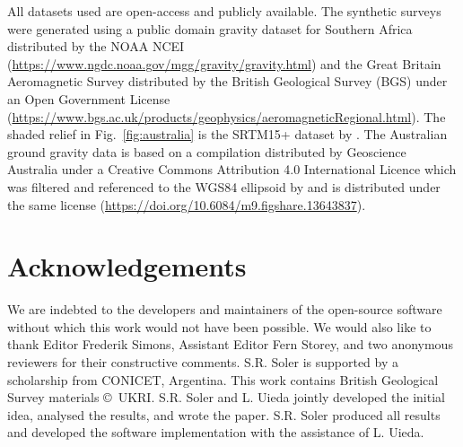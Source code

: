 All datasets used are open-access and publicly available.
The synthetic surveys were generated using
a public domain gravity dataset for Southern Africa distributed by the
NOAA NCEI (\url{https://www.ngdc.noaa.gov/mgg/gravity/gravity.html})
and the Great Britain Aeromagnetic
Survey distributed by the
British Geological Survey (BGS) under an Open Government License
(\url{https://www.bgs.ac.uk/products/geophysics/aeromagneticRegional.html}).
The shaded relief in Fig.~\ref{fig:australia} is the SRTM15+ dataset by
\citet{tozer2019}.
The Australian ground gravity
data is based on a compilation distributed by Geoscience Australia under a
Creative Commons Attribution 4.0 International Licence \citep{wynne2018}  which
was filtered and referenced to the WGS84 ellipsoid by
\citet{australia_compilation} and is distributed under the same license
(\url{https://doi.org/10.6084/m9.figshare.13643837}).



\section{Acknowledgements}

We are indebted to the developers and maintainers of the open-source software
without which this work would not have been possible.
We would also like to thank Editor Frederik Simons, Assistant Editor Fern
Storey, and two anonymous reviewers for their constructive comments.
S.R. Soler is supported by a scholarship from CONICET, Argentina.
This work contains British Geological Survey materials ©~UKRI.
S.R. Soler and L. Uieda jointly developed the initial idea, analysed the
results, and wrote the paper. S.R. Soler produced all results and developed the
software implementation with the assistance of L. Uieda.
